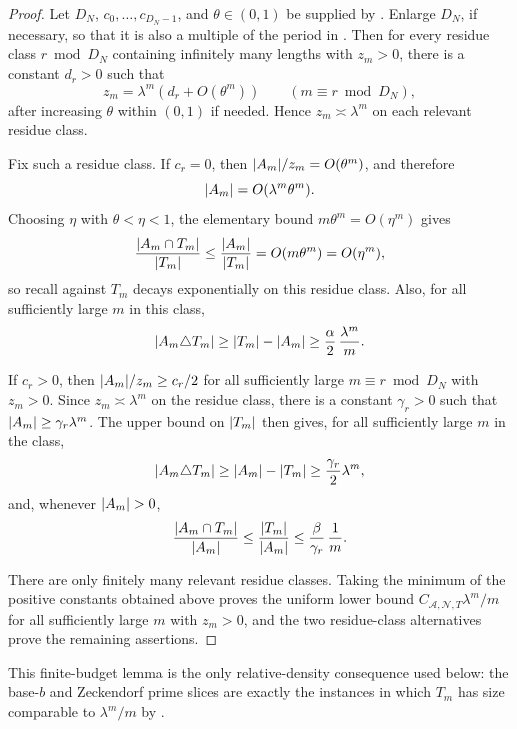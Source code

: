 \begin{proof}
  Let \(D_N\), \(c_0,\dots,c_{D_N-1}\), and \(\theta\in(0,1)\) be supplied
  by . Enlarge \(D_N\), if necessary, so that it
  is also a multiple of the period in . Then for
  every residue class \(r\bmod D_N\) containing infinitely many lengths
  with \(z_m>0\), there is a constant \(d_r>0\) such that
  \[
    z_m=\lambda^m(d_r+O(\theta^m))
    \qquad (m\equiv r\bmod {D_N}),
  \]
  after increasing \(\theta\) within \((0,1)\) if needed. Hence
  \(z_m\asymp\lambda^m\)
  on each relevant residue class.

  Fix such a residue class. If \(c_r=0\), then
  \(\lvert A_m \rvert/z_m=O(\theta^m)\), and therefore
  \[
    \lvert A_m \rvert=O(\lambda^m\theta^m).
  \]
  Choosing \(\eta\) with \(\theta<\eta<1\), the elementary bound
  \(m\theta^m=O(\eta^m)\) gives
  \[
    \frac{\lvert A_m\cap T_m \rvert}{\lvert T_m \rvert}
    \le \frac{\lvert A_m \rvert}{\lvert T_m \rvert}
    =O(m\theta^m)
    =O(\eta^m),
  \]
  so recall against \(T_m\) decays exponentially on this residue class.
  Also, for all sufficiently large \(m\) in this class,
  \[
    \lvert A_m\triangle T_m \rvert
    \ge \lvert T_m \rvert-\lvert A_m \rvert
    \ge \frac{\alpha}{2}\,\frac{\lambda^m}{m}.
  \]

  If \(c_r>0\), then \(\lvert A_m \rvert/z_m\ge c_r/2\) for all sufficiently
  large \(m\equiv r\bmod {D_N}\) with \(z_m>0\). Since
  \(z_m\asymp\lambda^m\) on the residue class, there is a constant
  \(\gamma_r>0\) such that \(\lvert A_m \rvert\ge\gamma_r\lambda^m\). The upper
  bound on \(\lvert T_m \rvert\) then gives, for all sufficiently large \(m\) in
  the class,
  \[
    \lvert A_m\triangle T_m \rvert
    \ge \lvert A_m \rvert-\lvert T_m \rvert
    \ge \frac{\gamma_r}{2}\lambda^m,
  \]
  and, whenever \(\lvert A_m \rvert>0\),
  \[
    \frac{\lvert A_m\cap T_m \rvert}{\lvert A_m \rvert}
    \le \frac{\lvert T_m \rvert}{\lvert A_m \rvert}
    \le \frac{\beta}{\gamma_r}\,\frac{1}{m}.
  \]

  There are only finitely many relevant residue classes. Taking the
  minimum of the positive constants obtained above proves the uniform
  lower bound \(C_{\mathcal A,\mathcal N,T}\lambda^m/m\) for all
  sufficiently large \(m\) with \(z_m>0\), and the two residue-class
  alternatives prove the remaining assertions.
\end{proof}

\noindent
This finite-budget lemma is the only relative-density consequence used
below: the base-\(b\) and Zeckendorf prime slices are exactly the
instances in which \(T_m\) has size comparable to \(\lambda^m/m\) by
.

